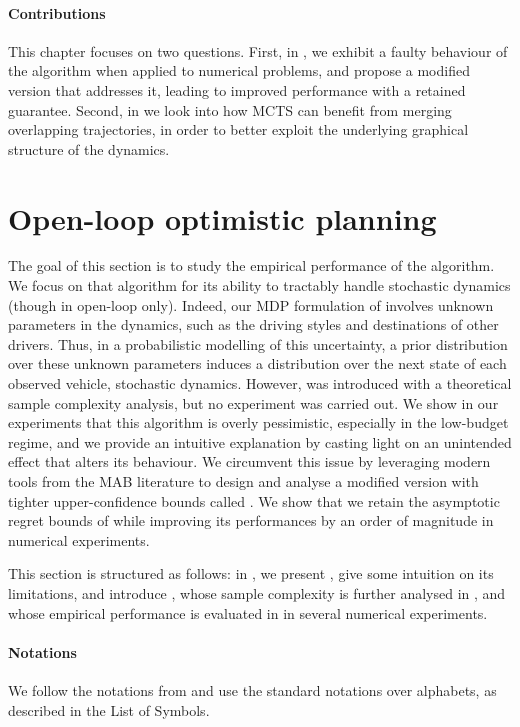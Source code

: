 \paragraph{Contributions} This chapter focuses on two questions. First, in , we exhibit a faulty behaviour of the \OLOP algorithm when applied to numerical problems, and propose a modified version that addresses it, leading to improved performance with a retained guarantee. Second, in  we look into how \gls{MCTS} can benefit from merging overlapping trajectories, in order to better exploit the underlying graphical structure of the dynamics.

\section{Open-loop optimistic planning}
\label{sec:olop}

The goal of this section is to study the empirical performance of the \OLOP algorithm. We focus on that algorithm for its ability to tractably handle stochastic dynamics (though in open-loop only). Indeed, our \gls{MDP} formulation of  involves unknown parameters in the dynamics, such as the driving styles and destinations of other drivers. Thus, in a probabilistic modelling of this uncertainty, a prior distribution over these unknown parameters induces a distribution over the next state of each observed vehicle, \ie stochastic dynamics. However, \OLOP was introduced with a theoretical sample complexity analysis, but no experiment was carried out. We show in our experiments that this algorithm is overly pessimistic, especially in the low-budget regime, and we provide an intuitive explanation by casting light on an unintended effect that alters its behaviour. We circumvent this issue by leveraging modern tools from the \gls{MAB} literature to design and analyse a modified version with tighter upper-confidence bounds called \KLOLOP. We show that we retain the asymptotic regret bounds of \OLOP while improving its performances by an order of magnitude in numerical experiments.

This section is structured as follows: in , we present \OLOP, give some intuition on its limitations, and introduce \KLOLOP, whose sample complexity is further analysed in , and whose empirical performance is evaluated in  in several numerical experiments.

\paragraph{Notations}
We follow the notations from \citep{Bubeck2010} and use the standard notations over alphabets, as described in the List of Symbols.

